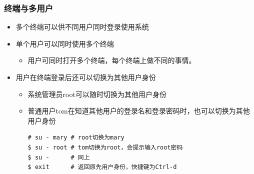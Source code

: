 \documentclass[xcolor=svgnames,presentation]{beamer}
\begin{document}
\begin{frame}[fragile]
\frametitle{终端与多用户}
\label{sec-4-1-2}
\begin{itemize}

\item 多个终端可以供不同用户同时登录使用系统
\label{sec-4-1-2-1}%

\item 单个用户可以同时使用多个终端
\label{sec-4-1-2-2}%
\begin{itemize}

\item 用户可同时打开多个终端，每个终端上做不同的事情。
\label{sec-4-1-2-2-1}%
\end{itemize} %

\item 用户在终端登录后还可以切换为其他用户身份
\label{sec-4-1-2-3}%
\begin{itemize}

\item 系统管理员root可以随时切换为其他用户身份
\label{sec-4-1-2-3-1}%

\item 普通用户tom在知道其他用户的登录名和登录密码时，也可以切换为其他用户身份\\
\label{sec-4-1-2-3-2}%
\begin{verbatim}
# su - mary # root切换为mary
$ su - root # tom切换为root，会提示输入root密码
$ su -      # 同上
$ exit      # 返回原先用户身份，快捷键为Ctrl-d
\end{verbatim}
\end{itemize} %
\end{itemize} %
\end{frame}
\end{document}
